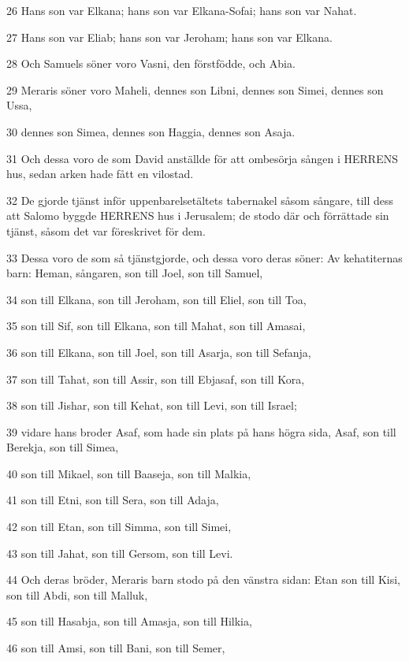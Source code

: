 \par 26 Hans son var Elkana; hans son var Elkana-Sofai; hans son var Nahat.
\par 27 Hans son var Eliab; hans son var Jeroham; hans son var Elkana.
\par 28 Och Samuels söner voro Vasni, den förstfödde, och Abia.
\par 29 Meraris söner voro Maheli, dennes son Libni, dennes son Simei, dennes son Ussa,
\par 30 dennes son Simea, dennes son Haggia, dennes son Asaja.
\par 31 Och dessa voro de som David anställde för att ombesörja sången i HERRENS hus, sedan arken hade fått en vilostad.
\par 32 De gjorde tjänst inför uppenbarelsetältets tabernakel såsom sångare, till dess att Salomo byggde HERRENS hus i Jerusalem; de stodo där och förrättade sin tjänst, såsom det var föreskrivet för dem.
\par 33 Dessa voro de som så tjänstgjorde, och dessa voro deras söner: Av kehatiternas barn: Heman, sångaren, son till Joel, son till Samuel,
\par 34 son till Elkana, son till Jeroham, son till Eliel, son till Toa,
\par 35 son till Sif, son till Elkana, son till Mahat, son till Amasai,
\par 36 son till Elkana, son till Joel, son till Asarja, son till Sefanja,
\par 37 son till Tahat, son till Assir, son till Ebjasaf, son till Kora,
\par 38 son till Jishar, son till Kehat, son till Levi, son till Israel;
\par 39 vidare hans broder Asaf, som hade sin plats på hans högra sida, Asaf, son till Berekja, son till Simea,
\par 40 son till Mikael, son till Baaseja, son till Malkia,
\par 41 son till Etni, son till Sera, son till Adaja,
\par 42 son till Etan, son till Simma, son till Simei,
\par 43 son till Jahat, son till Gersom, son till Levi.
\par 44 Och deras bröder, Meraris barn stodo på den vänstra sidan: Etan son till Kisi, son till Abdi, son till Malluk,
\par 45 son till Hasabja, son till Amasja, son till Hilkia,
\par 46 son till Amsi, son till Bani, son till Semer,
